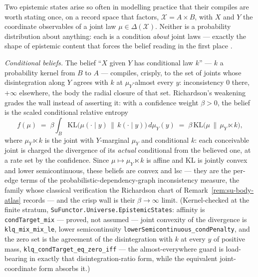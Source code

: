 \begin{example}
\label{ex:su-epistemic-states}
Two epistemic states arise so often in modelling practice that their
compiles are worth stating once, on a record space that factors,
$\mathcal{X} = A \times B$, with $X$ and $Y$ the coordinate
observables of a joint law $\mu \in \Delta(\mathcal{X})$. Neither is
a probability distribution about anything: each is a condition
\emph{about} joint laws --- exactly the shape of epistemic content
that forces the belief reading in the first place
\cite{dalrymple26imprecise}.

\emph{Conditional beliefs.} The belief ``$X$ given $Y$ has
conditional law $k$'' --- $k$ a probability kernel from $B$ to $A$
--- compiles, crisply, to the set of joints whose disintegration
along $Y$ agrees with $k$ at $\mu_Y$-almost every $y$: inconsistency
$0$ there, $+\infty$ elsewhere, the body the radial closure of that
set. Richardson's weakening \cite{richardson20} grades the wall
instead of asserting it: with a confidence weight $\beta > 0$, the
belief is the scaled conditional relative entropy
\[
  f(\mu) \;=\; \beta \int_B
  \mathrm{KL}\bigl(\mu(\cdot \mid y) \,\big\|\, k(\cdot \mid y)\bigr)
  \, d\mu_Y(y)
  \;=\; \beta\, \mathrm{KL}\bigl(\mu \,\big\|\, \mu_Y \ltimes k\bigr),
\]
where $\mu_Y \ltimes k$ is the joint with $Y$-marginal $\mu_Y$ and
conditional $k$: each conceivable joint is charged the divergence of
its \emph{actual} conditional from the believed one, at a rate set
by the confidence. Since $\mu \mapsto \mu_Y \ltimes k$ is affine and
$\mathrm{KL}$ is jointly convex and lower semicontinuous, these
beliefs are convex and lsc --- they are the per-edge terms of the
probabilistic-dependency-graph inconsistency measure, the family
whose classical verification the Richardson chart of
Remark~\ref{rem:su-body-atlas} records --- and the crisp wall is
their $\beta \to \infty$ limit. (Kernel-checked at the finite
stratum, \texttt{SuFunctor.Universe.EpistemicStates}: affinity is
\texttt{condTarget\_mix} --- proved, not assumed --- joint convexity
of the divergence is \texttt{klq\_mix\_mix\_le}, lower
semicontinuity \texttt{lowerSemicontinuous\_condPenalty}, and the
zero set is the agreement of the disintegration with $k$ at every
$y$ of positive mass, \texttt{klq\_condTarget\_eq\_zero\_iff} ---
the almost-everywhere guard is load-bearing in exactly that
disintegration-ratio form, while the equivalent joint-coordinate
form absorbs it.)


\end{example}
